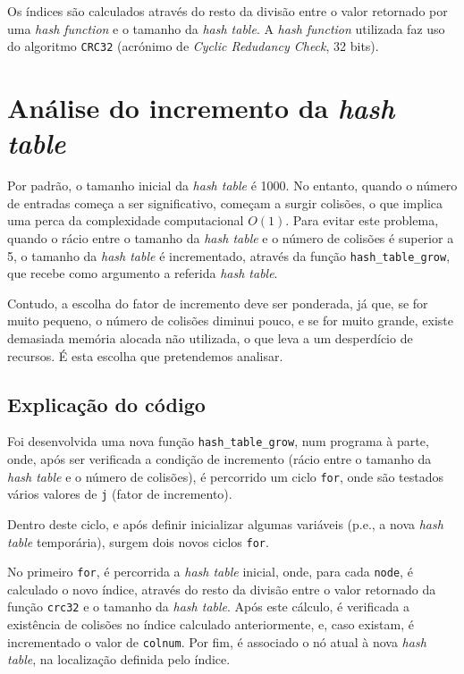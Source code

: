 \documentclass[portuguese,11pt,a4paper,titlepage]{article}
\newcommand{\srcdir}{..}
\newcommand{\hashtablegrowdir}{\srcdir/hash\_table\_grow-test}
\begin{document}
Os índices são calculados através do resto da divisão entre o valor retornado por uma \textit{hash function} e o tamanho da \textit{hash table}. A \textit{hash function} utilizada faz uso do algoritmo \lstinline|CRC32| (acrónimo de \textit{Cyclic Redudancy Check}, 32 bits).

\pagebreak
\section{Análise do incremento da \textit{hash table}}
Por padrão, o tamanho inicial da \textit{hash table} é 1000. No entanto, quando o número de entradas começa a ser significativo, começam a surgir colisões, o que implica uma perca da complexidade computacional \begin{math}O(1)\end{math}. Para evitar este problema, quando o rácio entre o tamanho da \textit{hash table} e o número de colisões é superior a 5, o tamanho da \textit{hash table} é incrementado, através da função \lstinline|hash_table_grow|, que recebe como argumento a referida \textit{hash table}.

Contudo, a escolha do fator de incremento deve ser ponderada, já que, se for muito pequeno, o número de colisões diminui pouco, e se for muito grande, existe demasiada memória alocada não utilizada, o que leva a um desperdício de recursos. É esta escolha que pretendemos analisar.

\subsection{Explicação do código}
Foi desenvolvida uma nova função \lstinline|hash_table_grow|, num programa à parte, onde, após ser verificada a condição de incremento (rácio entre o tamanho da \textit{hash table} e o número de colisões), é percorrido um ciclo \lstinline|for|, onde são testados vários valores de \lstinline|j| (fator de incremento).



Dentro deste ciclo, e após definir inicializar algumas variáveis (p.e., a nova \textit{hash table} temporária), surgem dois novos ciclos \lstinline|for|.

No primeiro \lstinline|for|, é percorrida a \textit{hash table} inicial, onde, para cada \lstinline|node|, é calculado o novo índice, através do resto da divisão entre o valor retornado da função \lstinline|crc32| e o tamanho da \textit{hash table}. Após este cálculo, é verificada a existência de colisões no índice calculado anteriormente, e, caso existam, é incrementado o valor de \lstinline|colnum|. Por fim, é associado o nó atual à nova \textit{hash table}, na localização definida pelo índice.
\end{document}
